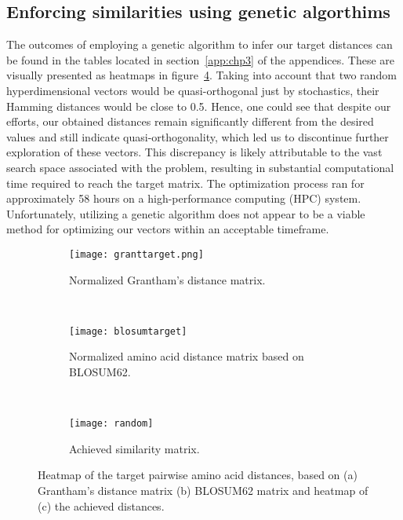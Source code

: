 \subsection*{Enforcing similarities using genetic algorthims}
The outcomes of employing a genetic algorithm to infer our target distances can be found in the tables located in section~\ref{app:chp3} of the appendices. These are visually presented as heatmaps in figure~\ref{fig:ga}. Taking into account that two random hyperdimensional vectors would be quasi-orthogonal just by stochastics, their Hamming distances would be close to 0.5. Hence, one could see that despite our efforts, our obtained distances remain significantly different from the desired values and still indicate quasi-orthogonality, which led us to discontinue further exploration of these vectors. This discrepancy is likely attributable to the vast search space associated with the problem, resulting in substantial computational time required to reach the target matrix. The optimization process ran for approximately 58 hours on a high-performance computing (HPC) system. Unfortunately, utilizing a genetic algorithm does not appear to be a viable method for optimizing our vectors within an acceptable timeframe.

\begin{figure}[H]
    \centering
    \begin{minipage}[b]{.5\textwidth}
    \begin{subfigure}[b]{\textwidth}
        \texttt{[image: granttarget.png]}
        \caption{Normalized Grantham's distance matrix.}
        \label{fig:grant}
    \end{subfigure}
\end{minipage}
\\
\centering
    \begin{minipage}[b]{.5\textwidth}
    \begin{subfigure}[b]{\textwidth}
        \texttt{[image: blosumtarget]}
        \caption{Normalized amino acid distance matrix based on BLOSUM62.}
        \label{fig:blosum}
    \end{subfigure}
    \end{minipage}
\\
\centering
    \begin{minipage}[b]{.5\textwidth}
    \begin{subfigure}[b]{\textwidth}
        \texttt{[image: random]}
        \caption{Achieved similarity matrix.}
        \label{fig:random}
    \end{subfigure}
    \end{minipage}
    \caption{Heatmap of the target pairwise amino acid distances, based on (a) Grantham's distance matrix (b) BLOSUM62 matrix and heatmap of (c) the achieved distances.}
    \label{fig:ga}
\end{figure}
